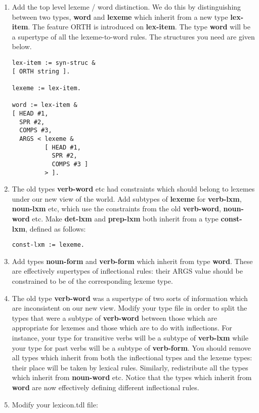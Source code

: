 \documentclass[10pt]{article}
\begin{document}
\begin{enumerate}
\item Add the top level lexeme / word distinction.   
We do this by distinguishing between two types, {\bf word} and {\bf lexeme}
which inherit from a new type {\bf lex-item}.  The feature ORTH
is introduced on {\bf lex-item}.  The type {\bf word}
will be a supertype of all the lexeme-to-word rules.  The structures you
need are given below.
\begin{verbatim}
lex-item := syn-struc &
[ ORTH string ].

lexeme := lex-item.

word := lex-item &
[ HEAD #1,
  SPR #2,
  COMPS #3,
  ARGS < lexeme &
         [ HEAD #1,
           SPR #2,
           COMPS #3 ]
         > ].
\end{verbatim}
\item The old types {\bf verb-word} etc had constraints which 
should belong to lexemes under our new view of the world.
Add subtypes of {\bf lexeme} for {\bf verb-lxm}, 
{\bf noun-lxm} etc, which use the constraints
from the old {\bf verb-word}, {\bf noun-word} etc.
Make {\bf det-lxm} and {\bf prep-lxm}
both inherit from a type {\bf const-lxm}, defined as follows:
\begin{verbatim}
const-lxm := lexeme.
\end{verbatim}
\item Add types {\bf noun-form} and {\bf verb-form} which inherit from type
{\bf word}.  These are effectively supertypes
of inflectional rules: their ARGS value should be constrained to
be of the corresponding lexeme type. 
\item  The old type {\bf verb-word}
was a supertype of two sorts of information which are 
inconsistent on our new view.
Modify your type file in order to
split the types that were a subtype of {\bf verb-word}
between those which are appropriate for lexemes
and those which are to do with inflections.  For instance, your 
type for transitive verbs will be a subtype of {\bf verb-lxm}
while your type for past verbs will be a subtype of {\bf verb-form}.
You should remove all types which inherit from both
the inflectional types and the lexeme types: 
their place will be taken by lexical
rules.
Similarly, redistribute all the types which inherit from 
{\bf noun-word} etc.
Notice that the types which inherit from {\bf word} are now effectively
defining different inflectional rules.
\item Modify your lexicon.tdl file:
\begin{enumerate}

\end{enumerate}
\end{enumerate}
\end{document}

